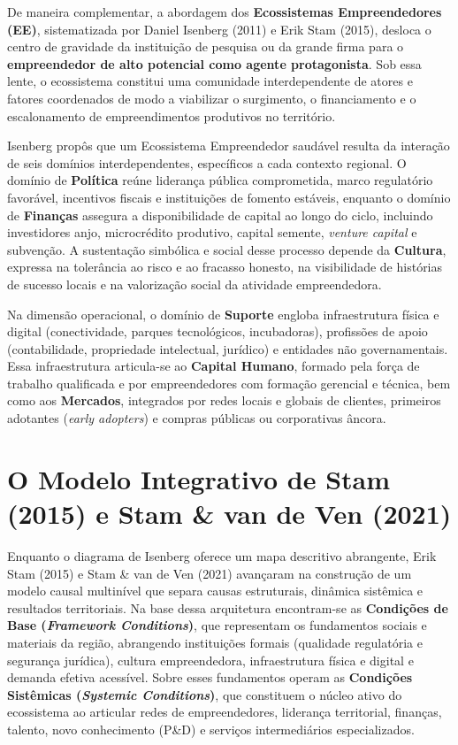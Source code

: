 De maneira complementar, a abordagem dos \textbf{Ecossistemas Empreendedores (EE)}, sistematizada por Daniel Isenberg (2011) e Erik Stam (2015), desloca o centro de gravidade da instituição de pesquisa ou da grande firma para o \textbf{empreendedor de alto potencial como agente protagonista}. Sob essa lente, o ecossistema constitui uma comunidade interdependente de atores e fatores coordenados de modo a viabilizar o surgimento, o financiamento e o escalonamento de empreendimentos produtivos no território.

\begin{boxConceito}
Isenberg propôs que um Ecossistema Empreendedor saudável resulta da interação de seis domínios interdependentes, específicos a cada contexto regional. O domínio de \textbf{Política} reúne liderança pública comprometida, marco regulatório favorável, incentivos fiscais e instituições de fomento estáveis, enquanto o domínio de \textbf{Finanças} assegura a disponibilidade de capital ao longo do ciclo, incluindo investidores anjo, microcrédito produtivo, capital semente, \textit{venture capital} e subvenção. A sustentação simbólica e social desse processo depende da \textbf{Cultura}, expressa na tolerância ao risco e ao fracasso honesto, na visibilidade de histórias de sucesso locais e na valorização social da atividade empreendedora.

Na dimensão operacional, o domínio de \textbf{Suporte} engloba infraestrutura física e digital (conectividade, parques tecnológicos, incubadoras), profissões de apoio (contabilidade, propriedade intelectual, jurídico) e entidades não governamentais. Essa infraestrutura articula-se ao \textbf{Capital Humano}, formado pela força de trabalho qualificada e por empreendedores com formação gerencial e técnica, bem como aos \textbf{Mercados}, integrados por redes locais e globais de clientes, primeiros adotantes (\textit{early adopters}) e compras públicas ou corporativas âncora.
\end{boxConceito}

\section{O Modelo Integrativo de Stam (2015) e Stam \& van de Ven (2021)}

Enquanto o diagrama de Isenberg oferece um mapa descritivo abrangente, Erik Stam (2015) e Stam \& van de Ven (2021) avançaram na construção de um modelo causal multinível que separa causas estruturais, dinâmica sistêmica e resultados territoriais. Na base dessa arquitetura encontram-se as \textbf{Condições de Base (\textit{Framework Conditions})}, que representam os fundamentos sociais e materiais da região, abrangendo instituições formais (qualidade regulatória e segurança jurídica), cultura empreendedora, infraestrutura física e digital e demanda efetiva acessível. Sobre esses fundamentos operam as \textbf{Condições Sistêmicas (\textit{Systemic Conditions})}, que constituem o núcleo ativo do ecossistema ao articular redes de empreendedores, liderança territorial, finanças, talento, novo conhecimento (P\&D) e serviços intermediários especializados.

